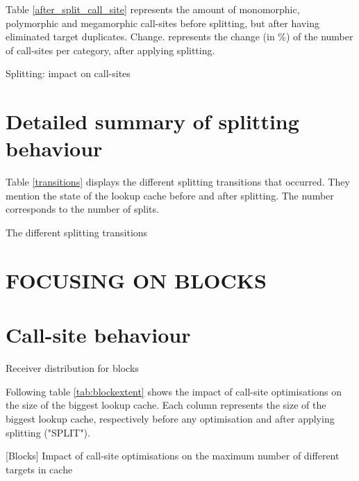 \documentclass[10pt, sigplan, preprint]{acmart}
\begin{document}
Table \ref{after_split_call_site} represents the amount of monomorphic, polymorphic and megamorphic call-sites before splitting, but after having eliminated target duplicates.
Change. represents the change (in \%) of the number of call-sites per category, after applying splitting.

\begin{table}[h!]
	\centering
	\tiny
	\AfterSplitSites
	\caption{Splitting: impact on call-sites}
	\label{after_split_call_site}
\end{table}

\section{Detailed summary of splitting behaviour}

Table \ref{transitions} displays the different splitting transitions that occurred. They mention the state of the lookup cache before and after splitting. The number corresponds to the number of splits.

\begin{table}[h!]
	\centering
	\tiny
	\SplittingTransitions
	\caption{The different splitting transitions}
	\label{transitions}
\end{table}

\section{FOCUSING ON BLOCKS}

\section{Call-site behaviour}

\begin{table}[!h]
	\caption{Receiver distribution for blocks}
	\centering
	\tiny
	\BlockDistribution
	\label{tab:blockdistribution}
\end{table}

Following table \ref{tab:blockextent} shows the impact of call-site optimisations on the size of the biggest lookup cache.
Each column represents the size of the biggest lookup cache, respectively before any optimisation and after applying splitting ("SPLIT").

\begin{table}[h!]
	\centering
	\tiny
	\BlockExtent
	\caption{[Blocks] Impact of call-site optimisations on the maximum number of different targets in cache}
	\label{tab:blockextent}
\end{table}
\end{document}
